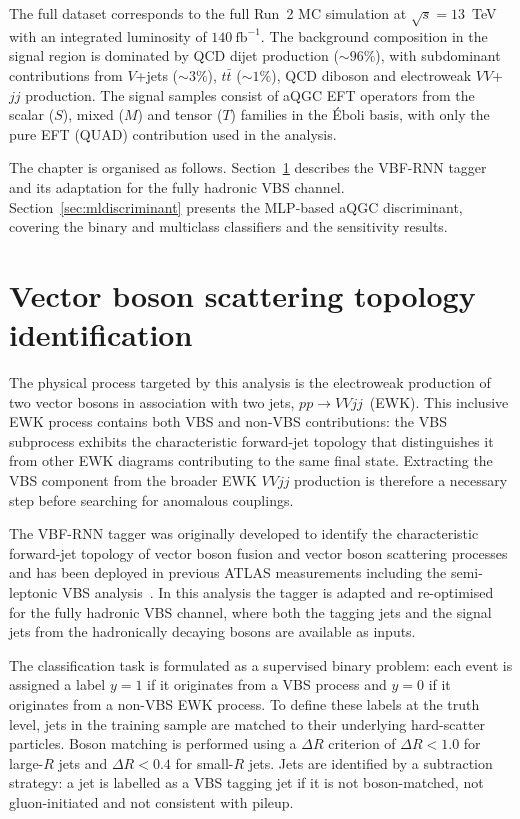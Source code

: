The full dataset corresponds to the full Run~2 MC simulation at $\sqrt{s} = 13$~TeV with an integrated luminosity of $140~\text{fb}^{-1}$. The background composition in the signal region is dominated by QCD dijet production ($\sim\!96\%$), with subdominant contributions from $V$+jets ($\sim\!3\%$), $t\bar{t}$ ($\sim\!1\%$), QCD diboson and electroweak $VV$+$jj$ production. The signal samples consist of aQGC EFT operators from the scalar ($S$), mixed ($M$) and tensor ($T$) families in the Éboli basis, with only the pure EFT (QUAD) contribution used in the analysis.

The chapter is organised as follows. Section~\ref{sec:vbfrnn} describes the VBF-RNN tagger and its adaptation for the fully hadronic VBS channel. Section~\ref{sec:mldiscriminant} presents the MLP-based aQGC discriminant, covering the binary and multiclass classifiers and the sensitivity results.

\section{Vector boson scattering topology identification}
\label{sec:vbfrnn}

The physical process targeted by this analysis is the electroweak production of two vector bosons in association with two jets, $pp \to VVjj$~(EWK). This inclusive EWK process contains both VBS and non-VBS contributions: the VBS subprocess exhibits the characteristic forward-jet topology that distinguishes it from other EWK diagrams contributing to the same final state. Extracting the VBS component from the broader EWK $VVjj$ production is therefore a necessary step before searching for anomalous couplings.

The VBF-RNN tagger was originally developed to identify the characteristic forward-jet topology of vector boson fusion and vector boson scattering processes and has been deployed in previous ATLAS measurements including the semi-leptonic VBS analysis~\cite{Antonio_VBFRNN_2023}. In this analysis the tagger is adapted and re-optimised for the fully hadronic VBS channel, where both the tagging jets and the signal jets from the hadronically decaying bosons are available as inputs.

The classification task is formulated as a supervised binary problem: each event is assigned a label $y = 1$ if it originates from a VBS process and $y = 0$ if it originates from a non-VBS EWK process. To define these labels at the truth level, jets in the training sample are matched to their underlying hard-scatter particles. Boson matching is performed using a $\Delta R$ criterion of $\Delta R < 1.0$ for large-$R$ jets and $\Delta R < 0.4$ for small-$R$ jets. Jets are identified by a subtraction strategy: a jet is labelled as a VBS tagging jet if it is not boson-matched, not gluon-initiated and not consistent with pileup.

